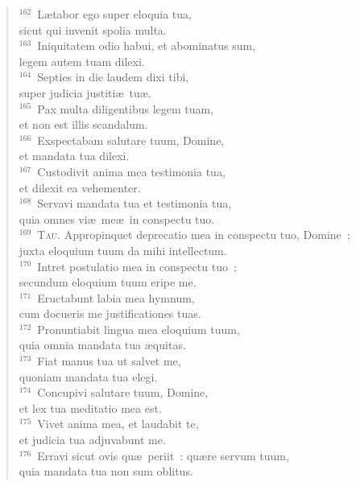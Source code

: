 \begin{verse}
${}^{162}$~L\ae tabor ego super eloquia tua,\\ sicut qui invenit spolia multa.\\
${}^{163}$~Iniquitatem odio habui, et abominatus sum,\\ legem autem tuam dilexi.\\
${}^{164}$~Septies in die laudem dixi tibi,\\ super judicia justiti\ae\ tu\ae .\\
${}^{165}$~Pax multa diligentibus legem tuam,\\ et non est illis scandalum.\\
${}^{166}$~Exspectabam salutare tuum, Domine,\\ et mandata tua dilexi.\\
${}^{167}$~Custodivit anima mea testimonia tua,\\ et dilexit ea vehementer.\\
${}^{168}$~Servavi mandata tua et testimonia tua,\\ quia omnes vi\ae\ me\ae\ in conspectu tuo.\\
${}^{169}$~\textsc{Tau.} Appropinquet deprecatio mea in conspectu tuo, Domine~;\\ juxta eloquium tuum da mihi intellectum.\\
${}^{170}$~Intret postulatio mea in conspectu tuo~;\\ secundum eloquium tuum eripe me.\\
${}^{171}$~Eructabunt labia mea hymnum,\\ cum docueris me justificationes tuas.\\
${}^{172}$~Pronuntiabit lingua mea eloquium tuum,\\ quia omnia mandata tua \ae quitas.\\
${}^{173}$~Fiat manus tua ut salvet me,\\ quoniam mandata tua elegi.\\
${}^{174}$~Concupivi salutare tuum, Domine,\\ et lex tua meditatio mea est.\\
${}^{175}$~Vivet anima mea, et laudabit te,\\ et judicia tua adjuvabunt me.\\
${}^{176}$~Erravi sicut ovis qu\ae\ periit~: qu\ae re servum tuum,\\ quia mandata tua non sum oblitus.\end{verse}



